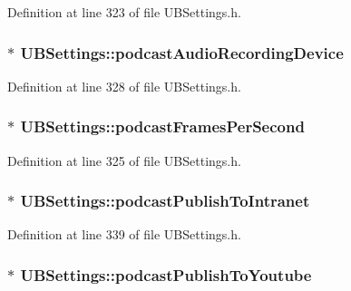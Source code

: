 Definition at line 323 of file U\-B\-Settings.\-h.

\hypertarget{class_u_b_settings_ab100dfc618a4defb43cbd56076fedb13}{
\subsubsection[{podcast\-Audio\-Recording\-Device}]{$\ast$ U\-B\-Settings\-::podcast\-Audio\-Recording\-Device}}\label{db/d66/class_u_b_settings_ab100dfc618a4defb43cbd56076fedb13}


Definition at line 328 of file U\-B\-Settings.\-h.

\hypertarget{class_u_b_settings_ade358dfc3050406270ae6754bafc04b7}{
\subsubsection[{podcast\-Frames\-Per\-Second}]{$\ast$ U\-B\-Settings\-::podcast\-Frames\-Per\-Second}}\label{db/d66/class_u_b_settings_ade358dfc3050406270ae6754bafc04b7}


Definition at line 325 of file U\-B\-Settings.\-h.

\hypertarget{class_u_b_settings_aba633a0fc798b1d99a211f211812ae05}{
\subsubsection[{podcast\-Publish\-To\-Intranet}]{$\ast$ U\-B\-Settings\-::podcast\-Publish\-To\-Intranet}}\label{db/d66/class_u_b_settings_aba633a0fc798b1d99a211f211812ae05}


Definition at line 339 of file U\-B\-Settings.\-h.

\hypertarget{class_u_b_settings_a6b089347aa3dc84801f3f4979547e852}{
\subsubsection[{podcast\-Publish\-To\-Youtube}]{$\ast$ U\-B\-Settings\-::podcast\-Publish\-To\-Youtube}}\label{db/d66/class_u_b_settings_a6b089347aa3dc84801f3f4979547e852}


